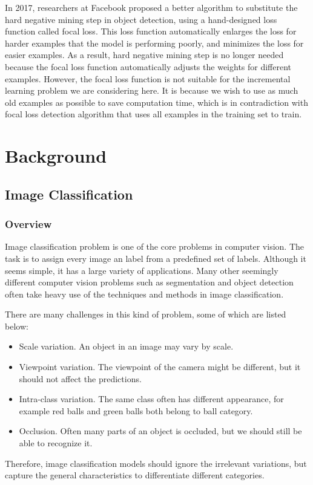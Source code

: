 In 2017, researchers at Facebook proposed a better algorithm to substitute the hard negative mining step in object detection, using a hand-designed loss function called focal loss\cite{lin2017focal}. This loss function automatically enlarges the loss for harder examples that the model is performing poorly, and minimizes the loss for easier examples. As a result, hard negative mining step is no longer needed because the focal loss function automatically adjusts the weights for different examples. However, the focal loss function is not suitable for the incremental learning problem we are considering here. It is because we wish to use as much old examples as possible to save computation time, which is in contradiction with focal loss detection algorithm that uses all examples in the training set to train.

\chapter{Background}

\section{Image Classification}
\subsection{Overview}
Image classification problem is one of the core problems in computer vision. The task is to assign every image an label from a predefined set of labels. Although it seems simple, it has a large variety of applications. Many other seemingly different computer vision problems such as segmentation and object detection often take heavy use of the techniques and methods in image classification. 

There are many challenges in this kind of problem, some of which are listed below:
\begin{itemize}
	\item Scale variation. An object in an image may vary by scale.
	\item Viewpoint variation. The viewpoint of the camera might be different, but it should not affect the predictions.
	\item Intra-class variation. The same class often has different appearance, for example red balls and green balls both belong to ball category.
	\item Occlusion. Often many parts of an object is occluded, but we should still be able to recognize it.
\end{itemize}
Therefore, image classification models should ignore the irrelevant variations, but capture the general characteristics to differentiate different categories.

